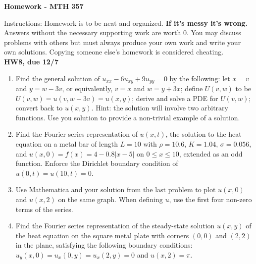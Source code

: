 \documentclass[10pt]{article}
\begin{document}
\begin{center}
{\Large\bf  Homework - MTH 357}\\
\vspace{.1in}


\end{center}

\noindent Instructions:  
Homework is to be neat and organized.  \textbf{If it's messy it's wrong.} Answers without the necessary supporting work are worth 0.   You may discuss problems with others but must always produce your own work and write your own solutions.  Copying someone else's homework is considered cheating.\\


\noindent \textbf{HW8, due 12/7}
\begin{enumerate}
\item Find the general solution of $u_{xx}-6u_{xy}+9u_{yy}=0$ by the following: let $x=v$ and $y=w-3v$, or equivalently, $v=x$ and $w=y+3x$; define $U(v,w)$ to be $U(v,w) = u(v,w-3v)=u(x,y)$; derive and solve a PDE for $U(v,w)$; convert back to $u(x,y)$.  Hint: the solution will involve two arbitrary functions. Use you solution to provide a non-trivial example of a solution.

\item  Find the Fourier series representation of $u(x,t)$, the solution to the heat equation on a metal bar of length $L=10$ with $\rho=10.6$, $K=1.04$, $\sigma=0.056$,  and $u(x,0)=f(x)=4-0.8|x-5|$ on $0\le x\le 10$, extended as an odd function.  Enforce the Dirichlet boundary condition of $u(0,t)=u(10,t)=0$.
\item Use Mathematica and your solution from the last problem to plot $u(x,0)$ and $u(x,2)$ on the same graph.  When defining $u$, use the first four non-zero terms of the series.
\item Find the Fourier series representation of the steady-state solution $u(x,y)$ of the heat equation on the square metal plate with corners $(0,0)$ and $(2,2)$ in the plane, satisfying the following boundary conditions: $u_y(x,0) = u_x(0,y) = u_x(2,y)=0$ and $u(x,2)=\pi$.
\end{enumerate}
\end{document}
